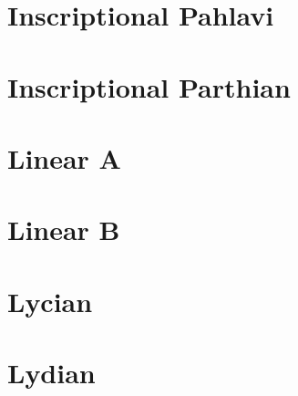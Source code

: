 \section{Inscriptional Pahlavi}

\section{Inscriptional Parthian}


\section{Linear A}

\section{Linear B}

\section{Lycian}

\section{Lydian}










